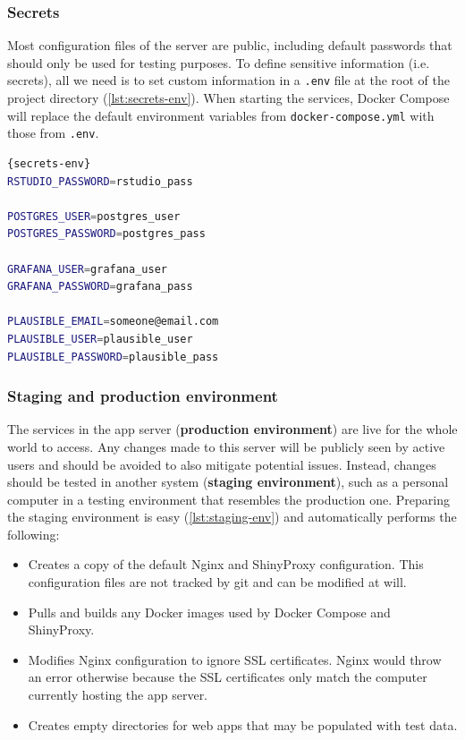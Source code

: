 
\subsubsection{Secrets}

Most configuration files of the server are public, including default passwords that should only be used for testing purposes. To define sensitive information (i.e. secrets), all we need is to set custom information in a \texttt{.env} file at the root of the project directory (\autoref{lst:secrets-env}). When starting the services, Docker Compose will replace the default environment variables from \texttt{docker-compose.yml} with those from \texttt{.env}.

\begin{lstlisting}[caption=Template of a \texttt{.env} file that defines sensitive data.,language=bash,label={lst:secrets-env}]{secrets-env}
RSTUDIO_PASSWORD=rstudio_pass

POSTGRES_USER=postgres_user
POSTGRES_PASSWORD=postgres_pass

GRAFANA_USER=grafana_user
GRAFANA_PASSWORD=grafana_pass

PLAUSIBLE_EMAIL=someone@email.com
PLAUSIBLE_USER=plausible_user
PLAUSIBLE_PASSWORD=plausible_pass
\end{lstlisting}

\subsubsection{Staging and production environment}

The services in the app server (\textbf{production environment}) are live for the whole world to access. Any changes made to this server will be publicly seen by active users and should be avoided to also mitigate potential issues. Instead, changes should be tested in another system (\textbf{staging environment}), such as a personal computer in a testing environment that resembles the production one. Preparing the staging environment is easy (\autoref{lst:staging-env}) and automatically performs the following:

\begin{itemize}
	\item Creates a copy of the default Nginx and ShinyProxy configuration. This configuration files are not tracked by git and can be modified at will.
	\item Pulls and builds any Docker images used by Docker Compose and ShinyProxy.
	\item Modifies Nginx configuration to ignore SSL certificates. Nginx would throw an error otherwise because the SSL certificates only match the computer currently hosting the app server.
	\item Creates empty directories for web apps that may be populated with test data.
\end{itemize}

